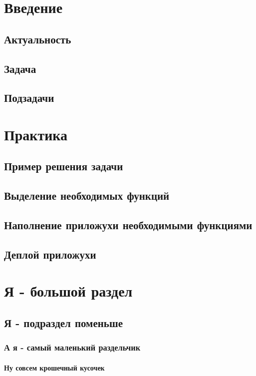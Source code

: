 \documentclass[14pt,a4paper]{scrartcl}
\begin{document}
    \section{Введение}
    \subsection{Актуальность}
    \subsection{Задача}
    \subsection{Подзадачи}

    \section{Практика}
    \subsection{Пример решения задачи}
    \subsection{Выделение необходимых функций}
    \subsection{Наполнение приложухи необходимыми функциями}
    \subsection{Деплой приложухи}

    \section{Я - большой раздел}
    \subsection{Я - подраздел поменьше}
    \subsubsection{А я - самый маленький раздельчик}
    \paragraph{Ну совсем крошечный кусочек}
\end{document}
